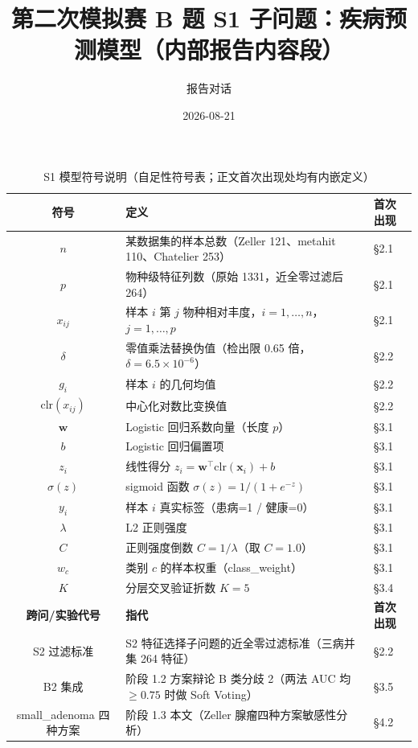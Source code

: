 \documentclass{internal-report}
\title{第二次模拟赛 B 题 S1 子问题：疾病预测模型（内部报告内容段）}
\author{报告对话}
\date{2026-08-21}
\begin{document}
\maketitle

\begin{table}[ht]
\centering
\caption{S1 模型符号说明（自足性符号表；正文首次出现处均有内嵌定义）}
\begin{tabular}{c l l}
\toprule
\textbf{符号} & \textbf{定义} & \textbf{首次出现} \\
\midrule
$n$ & 某数据集的样本总数（Zeller 121、metahit 110、Chatelier 253） & §2.1 \\
$p$ & 物种级特征列数（原始 1331，近全零过滤后 264） & §2.1 \\
$x_{ij}$ & 样本 $i$ 第 $j$ 物种相对丰度，$i=1,\dots,n$，$j=1,\dots,p$ & §2.1 \\
$\delta$ & 零值乘法替换伪值（检出限 0.65 倍，$\delta=6.5\times10^{-6}$） & §2.2 \\
$g_i$ & 样本 $i$ 的几何均值 & §2.2 \\
$\mathrm{clr}(x_{ij})$ & 中心化对数比变换值 & §2.2 \\
$\mathbf{w}$ & Logistic 回归系数向量（长度 $p$） & §3.1 \\
$b$ & Logistic 回归偏置项 & §3.1 \\
$z_i$ & 线性得分 $z_i=\mathbf{w}^{\top}\mathrm{clr}(\mathbf{x}_i)+b$ & §3.1 \\
$\sigma(z)$ & sigmoid 函数 $\sigma(z)=1/(1+e^{-z})$ & §3.1 \\
$y_i$ & 样本 $i$ 真实标签（患病=1 / 健康=0） & §3.1 \\
$\lambda$ & L2 正则强度 & §3.1 \\
$C$ & 正则强度倒数 $C=1/\lambda$（取 $C=1.0$） & §3.1 \\
$w_c$ & 类别 $c$ 的样本权重（class\_weight） & §3.1 \\
$K$ & 分层交叉验证折数 $K=5$ & §3.4 \\
\toprule
\textbf{跨问/实验代号} & \textbf{指代} & \textbf{首次出现} \\
\midrule
S2 过滤标准 & S2 特征选择子问题的近全零过滤标准（三病并集 264 特征） & §2.2 \\
B2 集成 & 阶段 1.2 方案辩论 B 类分歧 2（两法 AUC 均 $\geq 0.75$ 时做 Soft Voting） & §3.5 \\
small\_adenoma 四种方案 & 阶段 1.3 本文（Zeller 腺瘤四种方案敏感性分析） & §4.2 \\
\bottomrule
\end{tabular}
\end{table}
\end{document}
